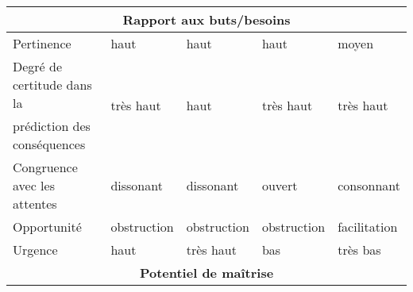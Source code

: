 \begin{table}[]
\begin{tabular}{|l|l|l|l|l|}
\multicolumn{5}{|c|}{\textbf{Rapport aux buts/besoins}}                                                                                                                                                                                                                                   \\ \hline
Pertinence                                            & haut                                                       & haut                                                & haut                                                     & moyen                                               \\ \hline
Degré de certitude dans la                            & \multirow{2}{*}{très haut}                                 & \multirow{2}{*}{haut}                               & \multirow{2}{*}{très haut}                               & \multirow{2}{*}{très haut}                          \\
prédiction des conséquences                           &                                                            &                                                     &                                                          &                                                     \\ \hline
Congruence avec les attentes                          & dissonant                                                  & dissonant                                           & ouvert                                                   & consonnant                                          \\ \hline
Opportunité                                           & obstruction                                                & obstruction                                         & obstruction                                              & facilitation                                        \\ \hline
Urgence                                               & haut                                                       & très haut                                           & bas                                                      & très bas                                            \\ \hline
\multicolumn{5}{|c|}{\textbf{Potentiel de maîtrise}}                                                                                                                                                                                                                                      \\ \hline

\end{tabular}
\end{table}
